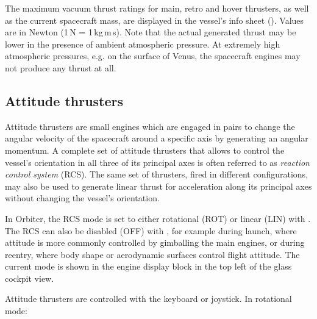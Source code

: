 \documentclass[Orbiter User Manual.tex]{subfiles}
\begin{document}
The maximum vacuum thrust ratings for main, retro and hover thrusters, as well
as the current spacecraft mass, are displayed in the vessel's info sheet
(). Values are in Newton (1\,N = 1\,kg\,m\,s).
Note that the actual generated thrust may be lower in the presence of ambient
atmospheric pressure. At extremely high atmospheric pressures, e.g. on the
surface of Venus, the spacecraft engines may not produce any thrust at all.


\subsection{Attitude thrusters}
\label{ssec:control_att}
Attitude thrusters are small engines which are engaged in pairs to change the
angular velocity of the spacecraft around a specific axis by generating an
angular momentum. A complete set of attitude thrusters that allows to control
the vessel's orientation in all three of its principal axes is often referred to
as \emph{reaction control system} (RCS). The same set of thrusters, fired in
different configurations, may also be used to generate linear thrust for
acceleration along its principal axes without changing the vessel's orientation.

In Orbiter, the RCS mode is set to either rotational (ROT) or linear (LIN) with
\keystroke{/}\num{}. The RCS can also be disabled (OFF) with
\keystroke{\ctrl,/}\num{}, for example during launch, where attitude is more
commonly controlled by gimballing the main engines, or during reentry, where
body shape or aerodynamic surfaces control flight attitude. The current mode is
shown in the engine display block in the top left of the glass cockpit view.

Attitude thrusters are controlled with the keyboard or joystick. In rotational
mode:
\end{document}
